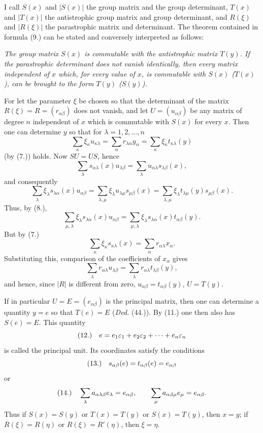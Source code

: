 \documentclass[11pt]{article}
\newcommand{\eps}{\varepsilon}
\newcommand{\fnum}[1]{\textup{(\ensuremath{#1}.)}\quad}
\begin{document}
I call $S(x)$ and $|S(x)|$ the group matrix and the group determinant, $T(x)$ and $|T(x)|$ the antistrophic group matrix and group determinant, and $R(\xi)$ and $|R(\xi)|$ the parastrophic matrix and determinant. The theorem contained in formula (9.) can be stated and conversely interpreted as follows:

\emph{The group matrix $S(x)$ is commutable with the antistrophic matrix $T(y)$. If the parastrophic determinant does not vanish identically, then every matrix independent of $x$ which, for every value of $x$, is commutable with $S(x)$ ($T(x)$), can be brought to the form $T(y)$ ($S(y)$).}

For let the parameter $\xi$ be chosen so that the determinant of the matrix $R(\xi)=R=(r_{\alpha\beta})$ does not vanish, and let $U=(u_{\alpha\beta})$ be any matrix of degree $n$ independent of $x$ which is commutable with $S(x)$ for every $x$. Then one can determine $y$ so that for $\lambda=1,2,\ldots,n$
\[
 \sum_\kappa \xi_\kappa u_{\kappa\lambda}
 =\sum_\alpha r_{\lambda\alpha}y_\alpha
 =\sum_\kappa \xi_\kappa t_{\kappa\lambda}(y)
\]
(by (7.)) holds. Now $SU=US$, hence
\[
 \sum_\lambda s_{\alpha\lambda}(x)u_{\lambda\beta}
 =\sum_\lambda u_{\alpha\lambda}s_{\lambda\beta}(x),
\]
and consequently
\[
 \sum_\lambda\xi_\lambda s_{\lambda\alpha}(x)u_{\alpha\beta}
 =\sum_{\lambda,\mu}\xi_\lambda u_{\lambda\mu}s_{\mu\beta}(x)
 =\sum_{\lambda,\mu}\xi_\lambda t_{\lambda\mu}(y)s_{\mu\beta}(x).
\]
Thus, by (8.),
\[
 \sum_{\mu,\lambda}\xi_\lambda s_{\lambda\alpha}(x)u_{\alpha\beta}
 =\sum_{\mu,\lambda}\xi_\lambda s_{\lambda\alpha}(x)t_{\alpha\beta}(y).
\]
But by (7.)
\[
 \sum_\kappa \xi_\kappa s_{\kappa\lambda}(x)=\sum_\alpha r_{\alpha\lambda}x_\alpha.
\]
Substituting this, comparison of the coefficients of $x_\alpha$ gives
\[
 \sum_\lambda r_{\alpha\lambda}u_{\lambda\beta}
 =\sum_\lambda r_{\alpha\lambda}t_{\lambda\beta}(y),
\]
and hence, since $|R|$ is different from zero, $u_{\alpha\beta}=t_{\alpha\beta}(y)$, $U=T(y)$.

If in particular $U=E=(e_{\alpha\beta})$ is the principal matrix, then one can determine a quantity $y=e$ so that $T(e)=E$ (\emph{Ded.} (44.)). By (11.) one then also has $S(e)=E$. This quantity
\[
\fnum{12} e=e_1\eps_1+e_2\eps_2+\cdots+e_n\eps_n
\]
is called the principal unit. Its coordinates satisfy the conditions
\[
\fnum{13} s_{\alpha\beta}(e)=t_{\alpha\beta}(e)=e_{\alpha\beta}
\]
or
\[
\fnum{14} \sum_\lambda a_{\alpha\lambda\beta}e_\lambda=e_{\alpha\beta},\qquad
\sum_\mu a_{\alpha\beta\mu}e_\mu=e_{\alpha\beta}.
\]
Thus if $S(x)=S(y)$ or $T(x)=T(y)$ or $S(x)=T(y)$, then $x=y$; if $R(\xi)=R(\eta)$ or $R(\xi)=R'(\eta)$, then $\xi=\eta$.
\end{document}
